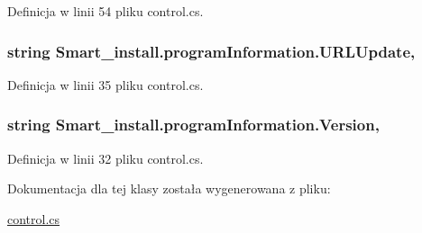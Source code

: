 Definicja w linii 54 pliku control.\+cs.

\hypertarget{class_smart__install_1_1program_information_aa3cc9e6105e16a5070dd96a54c58fea2}{
\subsubsection[{U\+R\+L\+Update}]{\setlength{\rightskip}{0pt plus 5cm}string Smart\+\_\+install.\+program\+Information.\+U\+R\+L\+Update\hspace{0.3cm}{\ttfamily [get]}, {\ttfamily [set]}}}\label{class_smart__install_1_1program_information_aa3cc9e6105e16a5070dd96a54c58fea2}


Definicja w linii 35 pliku control.\+cs.

\hypertarget{class_smart__install_1_1program_information_ae42077cb42cef8cd4ef9c43c0d3b0d55}{
\subsubsection[{Version}]{\setlength{\rightskip}{0pt plus 5cm}string Smart\+\_\+install.\+program\+Information.\+Version\hspace{0.3cm}{\ttfamily [get]}, {\ttfamily [set]}}}\label{class_smart__install_1_1program_information_ae42077cb42cef8cd4ef9c43c0d3b0d55}


Definicja w linii 32 pliku control.\+cs.



Dokumentacja dla tej klasy została wygenerowana z pliku\+:\begin{DoxyCompactItemize}
\item 
\hyperlink{control_8cs}{control.\+cs}\end{DoxyCompactItemize}
